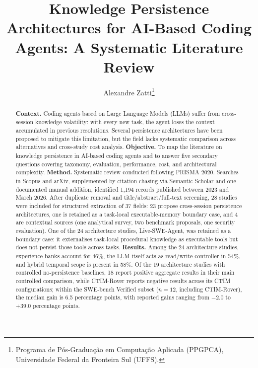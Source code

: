\documentclass[12pt,a4paper]{article}
\begin{document}
\title{Knowledge Persistence Architectures for AI-Based Coding Agents:
A Systematic Literature Review}

\author{
  Alexandre Zatti\thanks{Programa de Pós-Graduação em Computação
  Aplicada (PPGPCA), Universidade Federal da Fronteira Sul (UFFS).}
}

\date{}

\maketitle

\begin{abstract}
\textbf{Context.}
Coding agents based on Large Language Models (LLMs) suffer from
cross-session knowledge volatility: with every new task, the agent
loses the context accumulated in previous resolutions.
Several persistence architectures have been proposed to mitigate this
limitation, but the field lacks systematic comparison across
alternatives and cross-study cost analysis.
\textbf{Objective.}
To map the literature on knowledge persistence in AI-based coding
agents and to answer five secondary questions covering taxonomy,
evaluation, performance, cost, and architectural complexity.
\textbf{Method.}
Systematic review conducted following PRISMA 2020.
Searches in Scopus and arXiv, supplemented by citation chasing via
Semantic Scholar and one documented manual addition,
identified 1{,}194 records published between 2023 and March 2026.
After duplicate removal and title/abstract/full-text screening, 28
studies were included for structured extraction of 37 fields:
23 propose cross-session persistence architectures, one is retained as
a task-local executable-memory boundary case, and 4 are contextual
sources (one analytical survey, two benchmark proposals, one security
evaluation).
One of the 24 architecture studies, Live-SWE-Agent, was retained as a
boundary case: it externalises task-local procedural knowledge as
executable tools but does not persist those tools across tasks.
\textbf{Results.}
Among the 24 architecture studies, experience banks account for 46\%,
the LLM itself acts as read/write controller in 54\%, and hybrid
temporal scope is present in 58\%.
Of the 19 architecture studies with controlled no-persistence
baselines, 18 report positive aggregate results in their main
controlled comparison, while CTIM-Rover reports negative results
across its CTIM configurations;
within the SWE-bench Verified subset ($n=12$, including CTIM-Rover),
the median gain is 6.5 percentage points, with reported gains ranging
from $-$2.0 to +39.0 percentage points.

\end{abstract}
\end{document}
